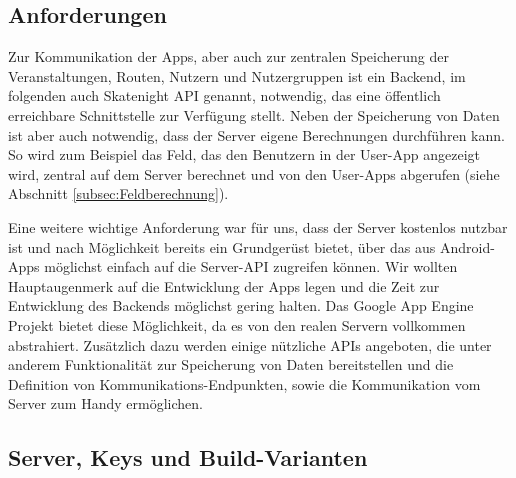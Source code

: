 \subsection{Anforderungen}
Zur Kommunikation der Apps, aber auch zur zentralen Speicherung der Veranstaltungen, Routen, Nutzern und Nutzergruppen ist ein Backend, im folgenden auch Skatenight API genannt, notwendig, das eine öffentlich erreichbare Schnittstelle zur Verfügung stellt. Neben der Speicherung von Daten ist aber auch notwendig, dass der Server eigene Berechnungen durchführen kann. So wird zum Beispiel das Feld, das den Benutzern in der User-App angezeigt wird, zentral auf dem Server berechnet und von den User-Apps abgerufen (siehe Abschnitt \ref{subsec:Feldberechnung}).

Eine weitere wichtige Anforderung war für uns, dass der Server kostenlos nutzbar ist und nach Möglichkeit bereits ein Grundgerüst bietet, über das aus Android-Apps möglichst einfach auf die Server-API zugreifen können. Wir wollten Hauptaugenmerk auf die Entwicklung der Apps legen und die Zeit zur Entwicklung des Backends möglichst gering halten. Das Google App Engine Projekt bietet diese Möglichkeit, da es von den realen Servern vollkommen abstrahiert. Zusätzlich dazu werden einige nützliche APIs angeboten, die unter anderem Funktionalität zur Speicherung von Daten bereitstellen und die Definition von Kommunikations-Endpunkten, sowie die Kommunikation vom Server zum Handy ermöglichen.

\subsection{Server, Keys und Build-Varianten}


